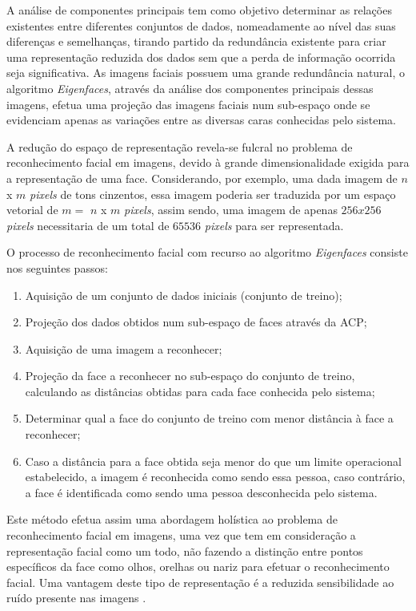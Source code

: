 A análise de componentes principais tem como objetivo determinar as relações existentes entre diferentes conjuntos de dados, nomeadamente ao nível das suas diferenças e semelhanças, tirando partido da redundância existente para criar uma representação reduzida dos dados sem que a perda de informação ocorrida seja significativa. As imagens faciais possuem uma grande redundância natural, o algoritmo \textit{Eigenfaces}, através da análise dos componentes principais dessas imagens, efetua uma projeção das imagens faciais num sub-espaço onde se evidenciam apenas as variações entre as diversas caras conhecidas pelo sistema.

A redução do espaço de representação revela-se fulcral no problema de reconhecimento facial em imagens, devido à grande dimensionalidade exigida para a representação de uma face. Considerando, por exemplo, uma dada imagem de $n$ x $m$ \textit{pixels} de tons cinzentos, essa imagem poderia ser traduzida por um espaço vetorial de $m = $ $n$ x $m$ \textit{pixels}, assim sendo, uma imagem de apenas $256x256$ \textit{pixels} necessitaria de um total de $65536$ \textit{pixels} para ser representada.

O processo de reconhecimento facial com recurso ao algoritmo \textit{Eigenfaces} consiste nos seguintes passos:
\begin{enumerate}
\item Aquisição de um conjunto de dados iniciais (conjunto de treino);
\item Projeção dos dados obtidos num sub-espaço de faces através da ACP;
\item Aquisição de uma imagem a reconhecer;
\item Projeção da face a reconhecer no sub-espaço do conjunto de treino, calculando as distâncias obtidas para cada face conhecida pelo sistema;
\item Determinar qual a face do conjunto de treino com menor distância à face a reconhecer;
\item Caso a distância para a face obtida seja menor do que um limite operacional estabelecido, a imagem é reconhecida como sendo essa pessoa, caso contrário, a face é identificada como sendo uma pessoa desconhecida pelo sistema.
\end{enumerate}

Este método efetua assim uma abordagem holística ao problema de reconhecimento facial em imagens, uma vez que tem em consideração a representação facial como um todo, não fazendo a distinção entre pontos específicos da face como olhos, orelhas ou nariz para efetuar o reconhecimento facial. Uma vantagem deste tipo de representação é a reduzida sensibilidade ao ruído presente nas imagens \cite{Zhao2003}.

